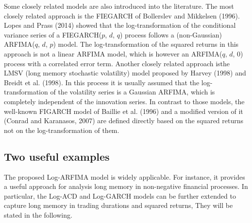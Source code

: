 \documentclass[12pt]{article}
\begin{document}
Some closely related models are also introduced into the literature. The most closely related approach is the FIEGARCH of Bollerslev and Mikkelsen (1996). Lopes and Prass (2014) showed that the log-transformation of the conditional variance series of a FIEGARCH($p$, $d$, $q$) process follows a (non-Gaussian) ARFIMA($q$, $d$, $p$) model. The log-transformation of the squared returns in this approach is not a linear ARFIMA model, which is however an ARFIMA($q$, $d$, 0) process with a correlated error term. Another closely related approach isthe LMSV (long memory stochastic volatility) model proposed by Harvey (1998) and Breidt et
al. (1998). In this process it is usually assumed that the log-transformation of the volatility series is a Gaussian ARFIMA, which is completely independent of the innovation series. In contrast to those models, the well-known FIGARCH model of Baillie et al. (1996) and a modified version of it (Conrad and Karanasos, 2007) are defined directly based on the squared returns not on the log-transformation of them. 



     






\subsection{Two useful examples} %


The proposed Log-ARFIMA model is widely applicable. For instance, it provides a useful approach for analysis long memory in non-negative financial processes. In particular, the Log-ACD and Log-GARCH models can be further extended to capture long memory in trading durations and squared returns, They will be stated in the following.
\end{document}
